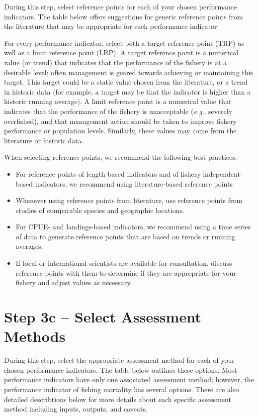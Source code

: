 \documentclass[]{book}
\begin{document}
During this step, select reference points for each of your chosen
performance indicators. The table below offers suggestions for generic
reference points from the literature that may be appropriate for each
performance indicator.

For every performance indicator, select both a target reference point
(TRP) as well as a limit reference point (LRP). A target reference point
is a numerical value (or trend) that indicates that the performance of
the fishery is at a desirable level; often management is geared towards
achieving or maintaining this target. This target could be a static
value chosen from the literature, or a trend in historic data (for
example, a target may be that the indicator is higher than a historic
running average). A limit reference point is a numerical value that
indicates that the performance of the fishery is unacceptable
(\emph{e.g}., severely overfished), and that management action should be
taken to improve fishery performance or population levels. Similarly,
these values may come from the literature or historic data.

When selecting reference points, we recommend the following best
practices:

\begin{itemize}
\item
  For reference points of length-based indicators and of
  fishery-independent-based indicators, we recommend using
  literature-based reference points
\item
  Whenever using reference points from literature, use reference points
  from studies of comparable species and geographic locations.
\item
  For CPUE- and landings-based indicators, we recommend using a time
  series of data to generate reference points that are based on trends
  or running averages.
\item
  If local or international scientists are available for consultation,
  discuss reference points with them to determine if they are
  appropriate for your fishery and adjust values as necessary.
\end{itemize}

\section{Step 3c -- Select Assessment
Methods}\label{step-3c-select-assessment-methods}

During this step, select the appropriate assessment method for each of
your chosen performance indicators. The table below outlines these
options. Most performance indicators have only one associated assessment
method; however, the performance indicator of fishing mortality has
several options. There are also detailed describtions below for more
details about each specific assessment method including inputs, outputs,
and caveats.
\end{document}
